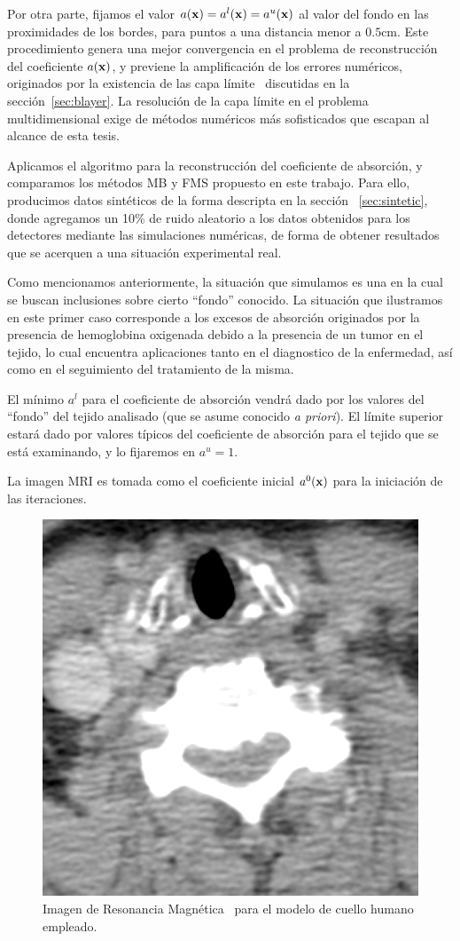 Por otra parte, fijamos el valor  $a(\mathbf{x})=a^l(\mathbf{x})=a^u(\mathbf{x})$ 
al valor del fondo en las proximidades de los bordes, para puntos 
a una distancia menor a $0.5$cm. Este procedimiento genera una mejor 
convergencia en el problema de reconstrucción del coeficiente $a(\mathbf{x})$, y previene 
la amplificación de los errores numéricos, originados por la existencia 
de las capa límite~\cite{Gaggioli2021} discutidas en la sección~\ref{sec:blayer}. 
La resolución de la capa límite en el problema multidimensional exige de métodos 
numéricos más sofisticados que escapan al alcance de esta tesis. 

Aplicamos el algoritmo para la reconstrucción del coeficiente 
de absorción, y comparamos los métodos MB y FMS propuesto en este trabajo. 
Para ello, producimos datos sintéticos de la forma descripta en la sección~
\ref{sec:sintetic}, donde agregamos un 10\% de ruido aleatorio a los datos obtenidos 
para los detectores mediante las simulaciones numéricas, de forma de obtener 
resultados que se acerquen a una situación experimental real.

Como mencionamos anteriormente, la situación que simulamos es una en la cual se buscan inclusiones sobre 
cierto ``fondo'' conocido. La situación que ilustramos en este primer caso corresponde 
a los excesos de absorción 
originados por la presencia de hemoglobina oxigenada debido a la presencia de un tumor 
en el tejido, lo cual encuentra aplicaciones tanto en el diagnostico de la enfermedad, así 
como en el seguimiento del tratamiento de la misma.

El mínimo $a^l$ para el coeficiente de absorción vendrá dado 
por los valores del ``fondo'' del tejido analisado (que se asume conocido \textit{a priori}). 
El límite superior estará dado por valores típicos del coeficiente de absorción 
para el tejido que se está examinando, y lo fijaremos en $a^u=1$.

La imagen MRI es tomada como el coeficiente inicial $a^0(\mathbf{x})$
para la iniciación de las iteraciones. 

\begin{figure}[h!]
\centering
  \includegraphics[width=0.25\linewidth]{figuras/neck_mri.png} 
  \caption{Imagen de Resonancia Magnética~\cite{CCommons} para el modelo de cuello humano empleado. } 
 \label{fig:mriim}
\end{figure}

